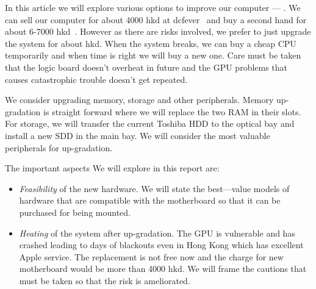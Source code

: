 In this article we will explore various options to improve our computer --- \model.
We can sell our computer for about 4000 hkd at dcfever~\cite{dc} and buy a second hand for about 6-7000 hkd~\cite{dcmac,carousellmac}. However as there are risks involved, we prefer to just upgrade the system for about \upgradeprice hkd. When the system breaks, we can buy a cheap CPU temporarily and when time is right we will buy a new one. Care must be taken that the logic board doesn't overheat in future and the GPU problems that causes catastrophic trouble doesn't get repeated.

We consider upgrading memory, storage and other peripherals.
Memory up-gradation is straight forward where we will replace the two RAM in their slots. For storage, we will transfer the current Toshiba HDD to the optical bay and install a new SDD in the main bay.
We will consider the most valuable peripherals for up-gradation. 

The important aspects We will explore in this report are:
\begin{itemize}
\item \emph{Feasibility} of the new hardware. We will state the best---value models of hardware that are compatible with the motherboard so that it can be purchased for being mounted.

\item \emph{Heating} of the system after up-gradation. The GPU is vulnerable and has crashed leading to days of blackouts even in Hong Kong which has excellent Apple service. The replacement is not free now and the charge for new motherboard would be more than 4000 hkd. We will frame the cautions that must be taken so that the risk is ameliorated. 
\end{itemize}

